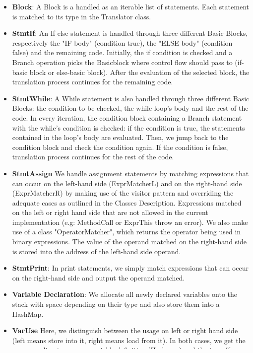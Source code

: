 \documentclass[paper=a4, fontsize=11pt]{scrartcl}
\numberwithin{equation}{section}		%
\numberwithin{figure}{section}			%
\numberwithin{table}{section}				%
\begin{document}
\begin{itemize}
	\item \textbf{Block}: A Block is a handled as an iterable list of statements. Each statement is matched to its type in the Translator class.
	\item \textbf{StmtIf}: An If-else statement is handled through three different Basic Blocks, respectively the "IF body" (condition true), the "ELSE body" (condition false) and the remaining code. Initially, the if condition is checked and a Branch operation picks the Basicblock where control flow should pass to (if-basic block or else-basic block). After the evaluation of the selected block, the translation process continues for the remaining code. 
	\item \textbf{StmtWhile}: A While statement is also handled through three different Basic Blocks: the condition to be checked, the while loop's body and the rest of the code. In every iteration, the condition block containing a Branch statement with the while's condition  is checked: if the condition is true, the statements contained in the loop's body are evaluated. Then, we jump back to the condition block and check the condition again. If the condition is false, translation process continues for the rest of the code.
	\item \textbf{StmtAssign} We handle assignment statements by matching expressions that can occur on the left-hand side (ExprMatcherL) and on the right-hand side (ExprMatcherR) by making use of the visitor pattern and overriding the adequate cases as outlined in the Classes Description. Expressions matched on the left or right hand side that are not allowed in the current implementation (e.g: MethodCall or ExprThis throw an error). We also make use of a class "OperatorMatcher", which returns the operator being used in binary expressions. The value of the operand matched on the right-hand side is stored into the address of the left-hand side operand. 
	\item \textbf{StmtPrint}: In print statements, we simply match expressions that can occur on the right-hand side and output the operand matched.
	\item \textbf{Variable Declaration}: We allocate all newly declared variables onto the stack with space depending on their type and also store them into a HashMap.
	\item \textbf{VarUse} Here, we distinguish between the usage on left or right hand side (left means store into it, right means load from it). In both cases, we get the corresponding temporary variable definition (Hashmap) and the type (from the Type and Name Analysis, by referring to the variable declaration). 
	\item \textbf{UnaryMinus}:We implemented the unary minus expression (ex: -b) through a binary expression, where the expression is multiplied by -1. 
	\item \textbf{UnaryNeg}: We implemented the unary negation expression ( ex: !b) through a XOR with a true value to invert the boolean value. 
\end{itemize}
\end{document}

